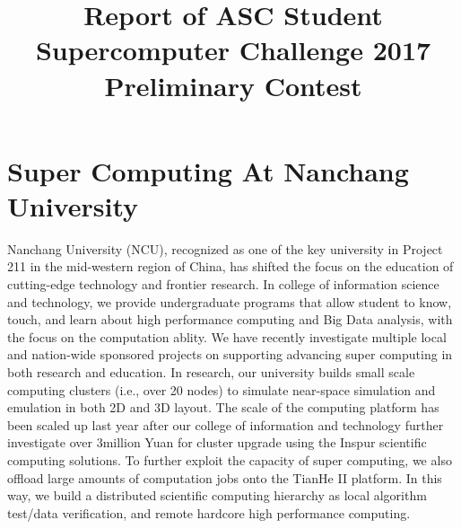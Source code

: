 \documentclass[conference,compsoc]{appendix/report}
\begin{document}
\title{Report of ASC Student Supercomputer Challenge 2017 Preliminary Contest}

\author{

\and


}

\maketitle


\section{Super Computing At Nanchang University}

Nanchang University (NCU), recognized as one of the key university in Project 211 in the mid-western region of China, has shifted the focus on the education of cutting-edge technology and frontier research. In college of information science and technology, we provide undergraduate programs that allow student to know, touch, and
learn about high performance computing and Big Data analysis, with the focus on the computation ablity.
We have recently investigate multiple local and nation-wide sponsored projects on supporting advancing super computing in both research and education. In research, our university builds small scale computing clusters (i.e., over 20 nodes) to simulate near-space simulation and emulation in both 2D and 3D layout.
The scale of the computing platform has been scaled up last year after our college of information and technology further investigate over 3million Yuan for cluster upgrade using the Inspur scientific computing
solutions. To further exploit the capacity of super computing, we also offload large amounts of computation jobs onto the TianHe II platform. In this way, we build a distributed scientific computing hierarchy as local algorithm test/data verification, and remote hardcore high performance computing.
\end{document}

